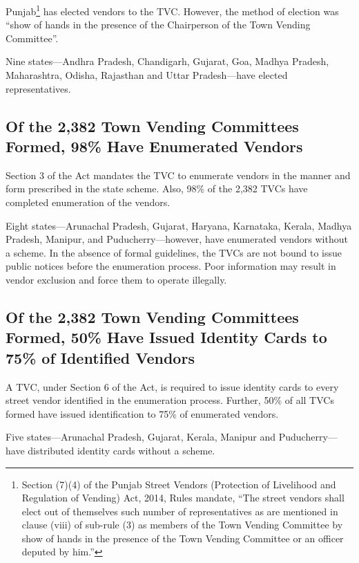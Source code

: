\documentclass[a4paper, 12pt, twoside]{article}
\begin{document}
{	Punjab\footnote{Section (7)(4) of the Punjab Street Vendors (Protection of Livelihood and Regulation of Vending) Act, 2014, Rules mandate, “The street vendors shall elect out of themselves such number of representatives as are mentioned in clause (viii) of sub-rule (3) as members of the Town Vending Committee by show of hands in the presence of the Town Vending Committee or an officer deputed by him.”} has elected vendors to the TVC. However, the method of election was  “show of hands in the presence of the Chairperson of the Town Vending Committee”.

	Nine states—Andhra Pradesh, Chandigarh, Gujarat, Goa, Madhya Pradesh, Maharashtra, Odisha, Rajasthan and Uttar Pradesh—have elected representatives.%

\subsection*{Of the 2,382 Town Vending Committees Formed, 98\% Have Enumerated Vendors}
	Section 3 of the Act mandates the TVC to enumerate vendors in the manner and form prescribed in the state scheme. Also, 98\% of the 2,382 TVCs have completed enumeration of the vendors.

	Eight states—Arunachal Pradesh, Gujarat, Haryana, Karnataka, Kerala, Madhya Pradesh, Manipur, and Puducherry—however, have enumerated vendors without a scheme. In the absence of formal guidelines, the TVCs are not bound to issue public notices before the enumeration process. Poor information may result in vendor exclusion and force them to operate illegally.

\subsection*{Of the 2,382 Town Vending Committees Formed, 50\% Have Issued Identity Cards to 75\% of Identified Vendors}

	A TVC, under Section 6 of the Act, is required to issue identity cards to every street vendor identified in the enumeration process.  Further, 50\% of all TVCs formed have issued identification to 75\% of enumerated vendors.

	Five states—Arunachal Pradesh, Gujarat, Kerala, Manipur and Puducherry—have distributed identity cards without a scheme.

}
\end{document}
